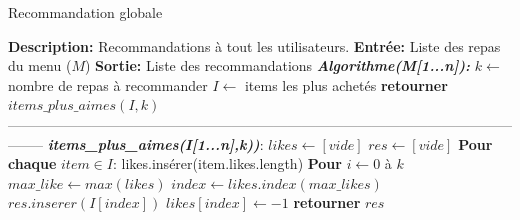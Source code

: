 \documentclass[11pt]{article}
\begin{document}
\begin{algorithm}
    \caption{Recommandation globale}
    \begin{algorithmic}[1]
        \Statex \textbf{Description:} Recommandations à tout les utilisateurs.
        \Statex \textbf{Entrée:} Liste des repas du menu ($M$)
        \Statex \textbf{Sortie:} Liste des recommandations
        \State \textbf{\textit{Algorithme(M[1...n]):}}
        \State \hspace{0.5cm} $k \leftarrow$ nombre de repas à recommander
        \State \hspace{0.5cm} $I \leftarrow$ items les plus achetés
        \State \hspace{0.5cm} \textbf{retourner} $items\_plus\_aimes(I,k)$
        \\
--------------------------------------------------------------------------------------------------------------------
	\State \textbf{\textit{items\_plus\_aimes(I[1...n],k))}}:
	\State \hspace{0.5cm} $likes \leftarrow [vide]$
	\State \hspace{0.5cm} $res \leftarrow [vide]$
	\State \hspace{0.5cm} \textbf{Pour chaque} $item \in I$:
	\State \hspace{1cm} likes.insérer(item.likes.length)
	\State \hspace{0.5cm} \textbf{Pour} $i \leftarrow 0$ à $k$
	\State \hspace{1cm} $max\_like \leftarrow max(likes)$
	\State \hspace{1cm} $index \leftarrow likes.index(max\_likes)$ 
	\State \hspace{1cm} $res.inserer(I[index])$
	\State \hspace{1cm} $likes[index] \leftarrow -1$
	\State \hspace{0.5cm} \textbf{retourner} $res$
    \end{algorithmic}
\end{algorithm}
\end{document}
